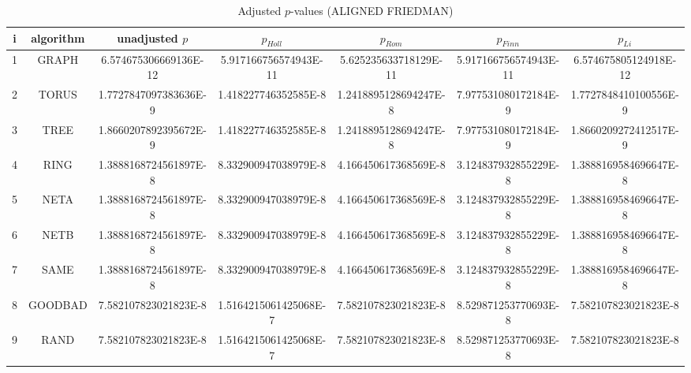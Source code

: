 \documentclass[a4paper,10pt]{article}
\begin{document}
\begin{landscape}
\begin{table}[!htp]
\centering\scriptsize
\caption{Adjusted $p$-values (ALIGNED FRIEDMAN)}
\begin{tabular}{ccccccc}
i&algorithm&unadjusted $p$&$p_{Holl}$&$p_{Rom}$&$p_{Finn}$&$p_{Li}$\\
\hline
1& GRAPH&6.574675306669136E-12&5.917166756574943E-11&5.625235633718129E-11&5.917166756574943E-11&6.574675805124918E-12\\
2& TORUS&1.7727847097383636E-9&1.418227746352585E-8&1.2418895128694247E-8&7.977531080172184E-9&1.7727848410100556E-9\\
3& TREE&1.8660207892395672E-9&1.418227746352585E-8&1.2418895128694247E-8&7.977531080172184E-9&1.8660209272412517E-9\\
4& RING&1.3888168724561897E-8&8.332900947038979E-8&4.166450617368569E-8&3.124837932855229E-8&1.3888169584696647E-8\\
5& NETA&1.3888168724561897E-8&8.332900947038979E-8&4.166450617368569E-8&3.124837932855229E-8&1.3888169584696647E-8\\
6& NETB&1.3888168724561897E-8&8.332900947038979E-8&4.166450617368569E-8&3.124837932855229E-8&1.3888169584696647E-8\\
7& SAME&1.3888168724561897E-8&8.332900947038979E-8&4.166450617368569E-8&3.124837932855229E-8&1.3888169584696647E-8\\
8& GOODBAD&7.582107823021823E-8&1.5164215061425068E-7&7.582107823021823E-8&8.529871253770693E-8&7.582107823021823E-8\\
9& RAND&7.582107823021823E-8&1.5164215061425068E-7&7.582107823021823E-8&8.529871253770693E-8&7.582107823021823E-8\\
\hline
\end{tabular}
\end{table}


\newpage


\end{landscape}
\end{document}
